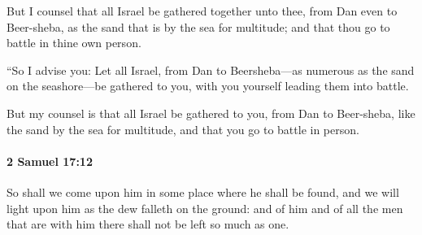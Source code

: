 			\begin{versebox}
					\item[BHS] 
					\item[ASV] But I counsel that all Israel be gathered together unto thee, from Dan even to Beer-sheba, as the sand that is by the sea for multitude; and that thou go to battle in thine own person.
					\item[NIV] “So I advise you: Let all Israel, from Dan to Beersheba—as numerous as the sand on the seashore—be gathered to you, with you yourself leading them into battle.
					\item[NRSV] But my counsel is that all Israel be gathered to you, from Dan to Beer-sheba, like the sand by the sea for multitude, and that you go to battle in person.
			\end{versebox}

		\paragraph{2 Samuel 17:12} %
			\label{2SAMUEL-17-12}

			So shall we come upon him in some place where he shall be found, and we will light upon him as the dew falleth on the ground: and of him and of all the men that are with him there shall not be left so much as one.

